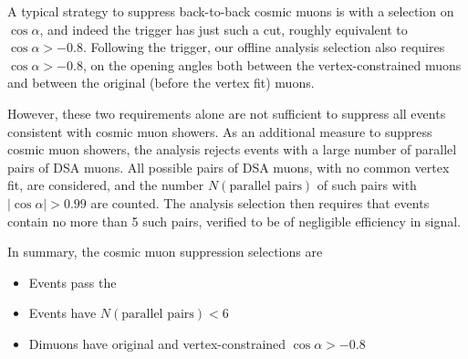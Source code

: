 A typical strategy to suppress back-to-back cosmic muons is with a selection on $\cos{\alpha}$, and indeed the trigger has just such a cut, roughly equivalent to $\cos{\alpha} > -0.8$.
Following the trigger, our offline analysis selection also requires $\cos{\alpha} > -0.8$, on the opening angles both between the vertex-constrained muons and between the original (before the vertex fit) muons.

However, these two requirements alone are not sufficient to suppress all events consistent with cosmic muon showers.
As an additional measure to suppress cosmic muon showers, the analysis rejects events with a large number of parallel pairs of DSA muons.
All possible pairs of DSA muons, with no common vertex fit, are considered, and the number $N(\text{parallel pairs})$ of such pairs with $|\cos{\alpha}| > 0.99$ are counted.
The analysis selection then requires that events contain no more than 5 such pairs, verified to be of negligible efficiency in signal.

In summary, the cosmic muon suppression selections are
\begin{itemize}
  \item Events pass the 
  \item Events have $N(\text{parallel pairs}) < 6$
  \item Dimuons have original and vertex-constrained $\cos{\alpha} > -0.8$
\end{itemize}

